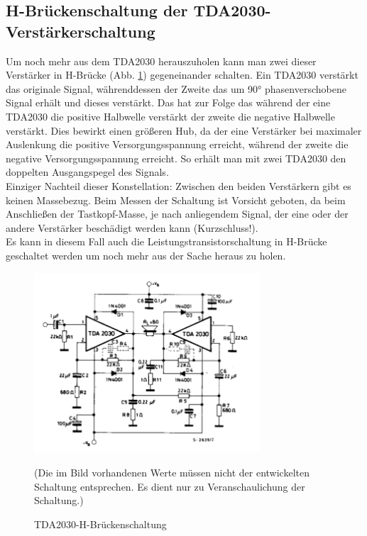 \newpage
\subsection{H-Brückenschaltung der TDA2030-Verstärkerschaltung}\label{subsec:8.3.4}
Um noch mehr aus dem TDA2030 herauszuholen kann man zwei dieser Verstärker in H-Brücke (Abb. \ref{fig:8.3.4.1}) gegeneinander schalten.
Ein TDA2030 verstärkt das originale Signal, währenddessen der Zweite das um 90° phasenverschobene Signal erhält und dieses verstärkt.
Das hat zur Folge das während der eine TDA2030 die positive Halbwelle verstärkt der zweite die negative Halbwelle verstärkt.
Dies bewirkt einen größeren Hub, da der eine Verstärker bei maximaler Auslenkung die positive Versorgungsspannung erreicht, während der zweite die negative Versorgungsspannung erreicht.
So erhält man mit zwei TDA2030 den doppelten Ausgangspegel des Signals.\\
Einziger Nachteil dieser Konstellation: Zwischen den beiden Verstärkern gibt es keinen Massebezug.
Beim Messen der Schaltung ist Vorsicht geboten, da beim Anschließen der Tastkopf-Masse, je nach anliegendem Signal, der eine oder der andere Verstärker beschädigt werden kann (Kurzschluss!).\\
Es kann in diesem Fall auch die Leistungstransistorschaltung in H-Brücke geschaltet werden um noch mehr aus der Sache heraus zu holen.
\begin{figure} [H]
	\centering
	\includegraphics[width=0.75\textwidth]{img/Grundlagen/TDA2030/TDA2030-H-Bruecke.PNG}
	\caption[TDA2030-H-Brückenschaltung]{TDA2030-H-Brückenschaltung\footnotemark}
	\text (Die im Bild vorhandenen Werte müssen nicht der entwickelten Schaltung entsprechen. Es dient nur zu Veranschaulichung der Schaltung.)
	\label {fig:8.3.4.1}
\end{figure}


